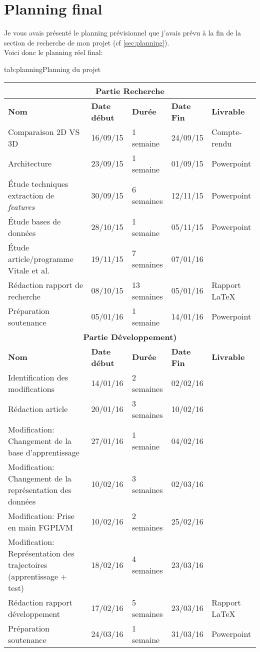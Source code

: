 \documentclass[poster]{polytech/polytech}
\begin{document}
\section{Planning final}
Je vous avais présenté le planning prévisionnel que j'avais prévu à la fin de la section de recherche de mon projet (cf \autoref{sec:planning}).\\
Voici donc le planning réel final:
\begin{Table}{tab:planning}{Planning du projet}
	\begin{tabular}{|p{5cm}|p{2cm}|p{2cm}|p{2cm}|p{2cm}|}
		\hline
		\multicolumn{5}{|c|}{\textbf{Partie Recherche}}\\\hline
		\textbf{Nom} &\textbf{Date début} &\textbf{Durée} &\textbf{Date Fin} &\textbf{Livrable}\\\hline
		Comparaison 2D VS 3D &16/09/15 &1 semaine &24/09/15 & Compte-rendu\\\hline
		Architecture &23/09/15 &1 semaine &01/09/15 & Powerpoint\\\hline
		Étude techniques extraction de \textit{features} &30/09/15 &6 semaines &12/11/15 & Powerpoint\\\hline
		Étude bases de données &28/10/15 &1 semaine &05/11/15 & Powerpoint\\\hline
		Étude article/programme Vitale et al. &19/11/15 &7 semaines &07/01/16 & \\\hline
		Rédaction rapport de recherche &08/10/15 &13 semaines &05/01/16 & Rapport \LaTeX\\\hline
		Préparation soutenance &05/01/16 &1 semaine &14/01/16 & Powerpoint\\\hline
		\hline
		\multicolumn{5}{|c|}{\textbf{Partie Développement)}}\\\hline
		\textbf{Nom} &\textbf{Date début} &\textbf{Durée} &\textbf{Date Fin} &\textbf{Livrable}\\\hline
		Identification des modifications &14/01/16 &2 semaines &02/02/16 & \\\hline
		Rédaction article &20/01/16 &3 semaines &10/02/16 & \\\hline
		Modification: Changement de la base d'apprentissage &27/01/16 &1 semaine &04/02/16 & \\\hline
		Modification: Changement de la représentation des données &10/02/16 &3 semaines &02/03/16 & \\\hline
		Modification: Prise en main FGPLVM &10/02/16 &2 semaines &25/02/16 & \\\hline
		Modification: Représentation des trajectoires (apprentissage + test) &18/02/16 &4 semaines &23/03/16 & \\\hline
		Rédaction rapport développement &17/02/16 &5 semaines &23/03/16 & Rapport \LaTeX\\\hline
		Préparation soutenance &24/03/16 &1 semaine &31/03/16 & Powerpoint\\\hline
	\end{tabular}
\end{Table}
\end{document}

